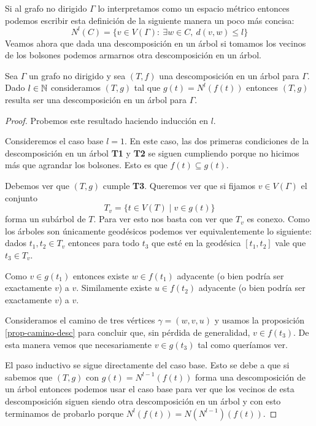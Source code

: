 \documentclass[tesis.tex]{subfiles}
\begin{document}
	Si al grafo no dirigido $\Gamma$ lo interpretamos como un espacio métrico entonces podemos escribir esta definición de la siguiente manera un poco más concisa:
	\[
		N^l (C) = \{ v \in V(\Gamma) : \ \exists w \in C, \  d(v,w) \le l  \}
	\]
	Veamos ahora que dada una descomposición en un árbol si tomamos los vecinos de los bolsones podemos armarnos otra descomposición en un árbol.


\begin{prop}\label{prop-vecinos-desc}
	Sea $\Gamma$ un grafo no dirigido y sea $(T,f)$ una descomposición en un árbol para $\Gamma$.
	Dado $l \in \mathbb{N}$ consideramos $(T,g)$ tal que $g(t) = N^l(f(t))$ entonces $(T,g)$ resulta ser una descomposición en un árbol para $\Gamma$.
\end{prop}
\begin{proof}
	Probemos este resultado haciendo inducción en $l$.
	
	Consideremos el caso base $l=1$.
	En este caso, las dos primeras condiciones de la descomposición en un árbol \textbf{T1} y \textbf{T2} se siguen cumpliendo porque no hicimos más que agrandar los bolsones. 
	Esto es que $f(t) \subseteq g(t)$.
	
	Debemos ver que $(T,g)$ cumple \textbf{T3}.
	Queremos ver que si fijamos $v \in V(\Gamma)$ el conjunto 
	\[
		T_{v} = \{ t \in V(T) \mid v \in g(t)  \}
	\]
	forma un subárbol de $T$. 
	Para ver esto nos basta con ver que $T_{v}$ es conexo.
	Como los árboles son únicamente geodésicos podemos ver equivalentemente lo siguiente:
	dados $t_{1}, t_{2} \in T_{v}$ entonces para todo $t_{3}$ que esté en la geodésica $[t_{1}, t_{2}]$ vale que $t_{3} \in T_{v}$. 
	
	Como $v \in g(t_{1})$ entonces existe $w \in f(t_{1})$ adyacente (o bien podría ser exactamente $v$) a $v$.
	Similamente existe $u \in f(t_{2})$ adyacente (o bien podría ser exactamente $v$) a $v$.
	
	Consideramos el camino de tres vértices $\gamma = (w,v,u)$ y usamos la proposición \ref{prop-camino-desc} para concluir que, sin pérdida de generalidad, $v \in f(t_{3})$.
	De esta manera vemos que necesariamente $v \in g(t_{3})$ tal como queríamos ver.
		
	El paso inductivo se sigue directamente del caso base.
	Esto se debe a que si sabemos que $(T,g)$ con $g(t) = N^{l-1}(f(t))$ forma una descomposición de un árbol entonces podemos usar el caso base para ver que los vecinos de esta descomposición siguen siendo otra descomposición en un árbol y con esto terminamos de probarlo porque $N^l(f(t)) = N (N^{l-1})(f(t))$.
\end{proof}
\medskip
\end{document}
